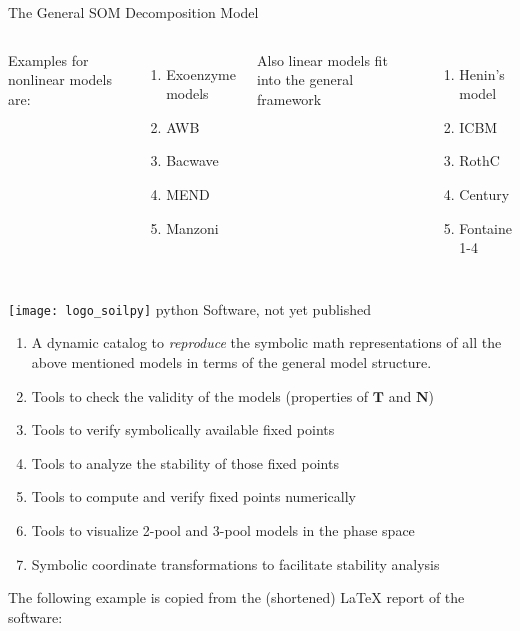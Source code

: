 \documentclass[final,hyperref={pdfpagelabels=false}, professionalmath, mathserif, 11pt]{beamer}
\begin{document}
\begin{frame}
\begin{columns}
\begin{column}{.48\textwidth}
\begin{minipage}[T]{.95\textwidth}
\begin{block}{The General SOM Decomposition Model}
\begin{columns}[b]
		Examples for nonlinear models are:
		\begin{enumerate}
			\item Exoenzyme models \citep{Schimel,Sinsabaugh}
			\item AWB \citep{Allison}
			\item Bacwave \citep{Zelenev}
			\item MEND \citep{WangMEND}
			\item Manzoni \citep{Manzoni07}
		\end{enumerate}
		Also linear models fit into the general framework 
		\begin{enumerate}
			\item Henin's model \citep{HeninDupuis, Henin}
			\item ICBM \citep{AndrenKatterer}
			\item RothC \citep{Jenkinson, Coleman} 
			\item Century \citep{Parton} 
			\item Fontaine 1-4 \citep{Fontaine}
		\end{enumerate}
    \end{columns}
    \end{block}
      \begin{block}{
	  \texttt{[image: logo\_soilpy]} 
	  \hspace{1cm}
	  python Software, not yet published 
	  }
	\begin{enumerate}
		\item A dynamic  catalog to \emph{reproduce} the symbolic math representations of all the above 
		mentioned models in terms of the general model structure.
		\item Tools to check the validity of the models (properties of $\mathbf{T}$ and $\mathbf{N}$)
		\item Tools to verify symbolically available fixed points 
		\item Tools to analyze the stability of those fixed points
		\item Tools to compute and verify fixed points numerically
		\item Tools to visualize 2-pool and 3-pool models in the phase space 
		\item Symbolic coordinate transformations to facilitate stability analysis
	\end{enumerate}
The following example \citep{Manzoni07} is copied from the (shortened) \LaTeX \hspace{1ex}  report of the software:\\ 

\end{block}
\end{minipage}
\end{column}
\end{columns}
\end{frame}
\end{document}
